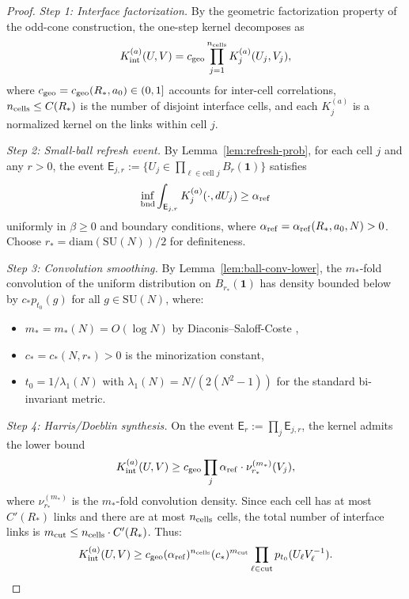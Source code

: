 \documentclass[11pt]{amsart}
\begin{document}
\begin{proof}
\emph{Step 1: Interface factorization.} By the geometric factorization property of the odd-cone construction, the one-step kernel decomposes as
\[
  K_{\rm int}^{(a)}(U,V) = c_{\rm geo} \prod_{j=1}^{n_{\rm cells}} K_j^{(a)}(U_j,V_j),
\]
where $c_{\rm geo} = c_{\rm geo}(R_*,a_0) \in (0,1]$ accounts for inter-cell correlations, $n_{\rm cells} \le C(R_*)$ is the number of disjoint interface cells, and each $K_j^{(a)}$ is a normalized kernel on the links within cell $j$.

\emph{Step 2: Small-ball refresh event.} By Lemma~\ref{lem:refresh-prob}, for each cell $j$ and any $r > 0$, the event $\mathsf{E}_{j,r} := \{U_j \in \prod_{\ell \in \text{cell } j} B_r(\mathbf{1})\}$ satisfies
\[
  \inf_{\text{bnd}} \int_{\mathsf{E}_{j,r}} K_j^{(a)}(\cdot, dU_j) \ge \alpha_{\rm ref}
\]
uniformly in $\beta \ge 0$ and boundary conditions, where $\alpha_{\rm ref} = \alpha_{\rm ref}(R_*,a_0,N) > 0$. Choose $r_* = \text{diam}(\mathrm{SU}(N))/2$ for definiteness.

\emph{Step 3: Convolution smoothing.} By Lemma~\ref{lem:ball-conv-lower}, the $m_*$-fold convolution of the uniform distribution on $B_{r_*}(\mathbf{1})$ has density bounded below by $c_* p_{t_0}(g)$ for all $g \in \mathrm{SU}(N)$, where:
\begin{itemize}
  \item $m_* = m_*(N) = O(\log N)$ by Diaconis--Saloff-Coste \cite{DiaconisSaloffCoste2004},
  \item $c_* = c_*(N,r_*) > 0$ is the minorization constant,
  \item $t_0 = 1/\lambda_1(N)$ with $\lambda_1(N) = N/(2(N^2-1))$ for the standard bi-invariant metric.
\end{itemize}

\emph{Step 4: Harris/Doeblin synthesis.} On the event $\mathsf{E}_r := \prod_{j} \mathsf{E}_{j,r}$, the kernel admits the lower bound
\[
  K_{\rm int}^{(a)}(U,V) \ge c_{\rm geo} \prod_{j} \alpha_{\rm ref} \cdot \nu_{r_*}^{(m_*)}(V_j),
\]
where $\nu_{r_*}^{(m_*)}$ is the $m_*$-fold convolution density. Since each cell has at most $C'(R_*)$ links and there are at most $n_{\rm cells}$ cells, the total number of interface links is $m_{\rm cut} \le n_{\rm cells} \cdot C'(R_*)$. Thus:
\[
  K_{\rm int}^{(a)}(U,V) \ge c_{\rm geo} (\alpha_{\rm ref})^{n_{\rm cells}} (c_*)^{m_{\rm cut}} \prod_{\ell \in \text{cut}} p_{t_0}(U_\ell V_\ell^{-1}).
\]


\end{proof}
\end{document}
